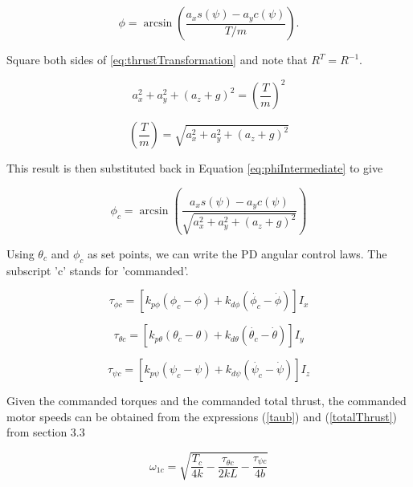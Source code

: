 \begin{equation}
    \label{eq:phiIntermediate}
    \phi = \arcsin( \frac{a_x s(\psi) - a_y c(\psi)}{T/m} ).
\end{equation}

Square both sides of \eqref{eq:thrustTransformation} and note that $ R^T = R^{-1}$.

\begin{equation}
a_x^2 + a_y^2 + (a_z + g)^2 = (\frac{T}{m})^2
\end{equation}

\begin{equation}
(\frac{T}{m}) = \sqrt{a_x^2 + a_y^2 + (a_z + g)^2}
\end{equation}


This result is then substituted back in Equation \eqref{eq:phiIntermediate} to give

\begin{equation}
    \label{eq:phic}
    \phi_c = \arcsin( \frac{a_x s(\psi) - a_y c(\psi)}{\sqrt{a_x^2 + a_y^2 + (a_z + g)^2}} )
\end{equation}


Using $\theta_c$ and $\phi_c$ as set points, we can write the PD angular control laws. The subscript 'c' stands for 'commanded'.

\begin{equation}
    \tau_{\phi c} = [ k_{p\phi} (\phi_c - \phi) + k_{d\phi} (\dot{\phi_c} - \dot{\phi}) ] I_x
\end{equation}

\begin{equation}
    \tau_{\theta c} = [ k_{p\theta} (\theta_c - \theta) + k_{d\theta} (\dot{\theta_c} - \dot{\theta}) ] I_y
\end{equation}

\begin{equation}
    \tau_{\psi c} = [ k_{p\psi} (\psi_c - \psi) + k_{d\psi} (\dot{\psi_c} - \dot{\psi}) ] I_z
\end{equation}

Given the commanded torques and the commanded total thrust, the commanded motor speeds can be obtained from the expressions (\ref{taub}) and (\ref{totalThrust}) from section 3.3





\begin{equation}
    \omega_{1c} = \sqrt{ \frac{T_c}{4 k} - \frac{ \tau_{\theta c}}{2 k L} - \frac{ \tau_{\psi c} }{4 b } }
\end{equation}

